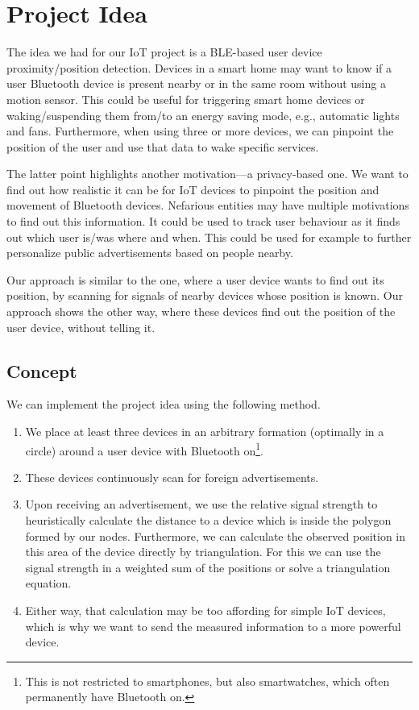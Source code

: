 


\maketitle

\section{Project Idea}
The idea we had for our IoT project is a BLE-based user device proximity/position detection.
Devices in a smart home may want to know if a user Bluetooth device is present nearby or in the same room without using a motion sensor.
This could be useful for triggering smart home devices or waking/suspending them from/to an energy saving mode, e.g., automatic lights and fans.
Furthermore, when using three or more devices, we can pinpoint the position of the user and use that data to wake specific services.

The latter point highlights another motivation---a privacy-based one.
We want to find out how realistic it can be for IoT devices to pinpoint the position and movement of Bluetooth devices.
Nefarious entities may have multiple motivations to find out this information.
It could be used to track user behaviour as it finds out which user is/was where and when.
This could be used for example to further personalize public advertisements based on people nearby.

Our approach is similar to the one, where a user device wants to find out its position, by scanning for signals of nearby devices whose position is known.
Our approach shows the other way, where these devices find out the position of the user device, without telling it.

\subsection{Concept}
We can implement the project idea using the following method.
\begin{enumerate}
    \item We place at least three devices in an arbitrary formation (optimally in a circle) around a user device with Bluetooth on\footnote{This is not restricted to smartphones, but also smartwatches, which often permanently have Bluetooth on.}.

    \item These devices continuously scan for foreign advertisements.

    \item Upon receiving an advertisement, we use the relative signal strength to heuristically calculate the distance to a device which is inside the polygon formed by our nodes.
        Furthermore, we can calculate the observed position in this area of the device directly by triangulation.
        For this we can use the signal strength in a weighted sum of the positions or solve a triangulation equation.

    \item Either way, that calculation may be too affording for simple IoT devices, which is why we want to send the measured information to a more powerful device.
\end{enumerate}

